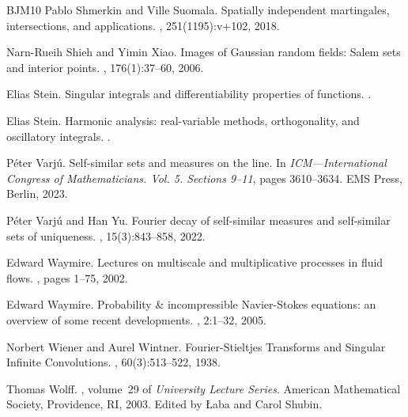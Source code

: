 \documentclass[12pt]{amsart}
\theoremstyle{definition}
\theoremstyle{remark}
\numberwithin{equation}{section}
\begin{document}
\begin{thebibliography}{BJM10}
	Pablo Shmerkin and Ville Suomala.
	\newblock Spatially independent martingales, intersections, and applications.
	, 251(1195):v+102, 2018.
	
	Narn-Rueih Shieh and Yimin Xiao.
	\newblock Images of {G}aussian random fields: {S}alem sets and interior points.
	, 176(1):37--60, 2006.
	
	Elias Stein.
	\newblock Singular integrals and differentiability properties of functions.
	.
	
	Elias Stein.
	\newblock Harmonic analysis: real-variable methods, orthogonality, and oscillatory integrals.
	.
	
	
	P\'{e}ter Varj\'{u}.
	\newblock Self-similar sets and measures on the line.
	\newblock In {\em I{CM}---{I}nternational {C}ongress of {M}athematicians.
		{V}ol. 5. {S}ections 9--11}, pages 3610--3634. EMS Press, Berlin, 2023.
	
	P\'{e}ter Varj\'{u} and Han Yu.
	\newblock Fourier decay of self-similar measures and self-similar sets of
	uniqueness.
	, 15(3):843--858, 2022.
	
	
	Edward Waymire.
	\newblock Lectures on multiscale and multiplicative processes in fluid flows.
	, pages 1--75,
	2002.
	
	Edward Waymire.
	\newblock Probability \& incompressible {N}avier-{S}tokes equations: an
	overview of some recent developments.
	, 2:1--32, 2005.
	
	Norbert Wiener and Aurel Wintner.
	\newblock Fourier-{S}tieltjes {T}ransforms and {S}ingular {I}nfinite
	{C}onvolutions.
	, 60(3):513--522, 1938.
	
	Thomas Wolff.
	, volume~29 of {\em University
		Lecture Series}.
	\newblock American Mathematical Society, Providence, RI, 2003.
	\newblock Edited by {\L}aba and Carol Shubin.
\end{thebibliography}
\end{document}
